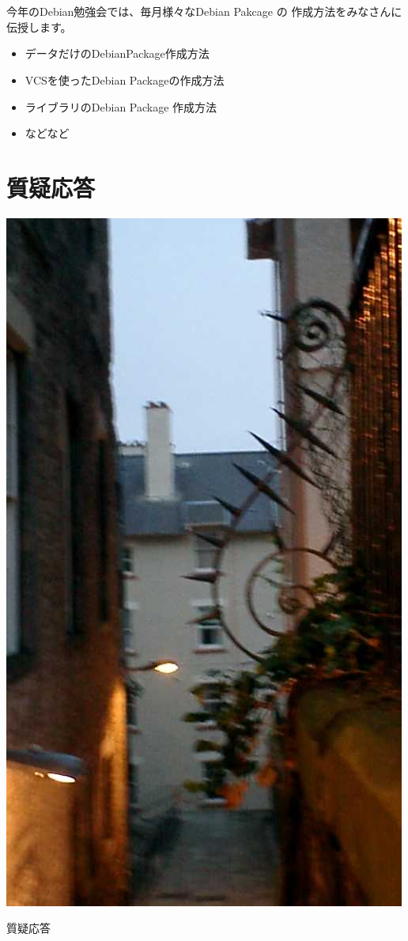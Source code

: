 \documentclass[cjk,dvipdfmx,12pt]{beamer}
\newcommand{\emtext}[1]{
\begin{frame}{}
 
\begin{minipage}{0.55\hsize}
\includegraphics[width=1\hsize]{image200707/gurutitle.jpg}
\end{minipage}
\begin{minipage}{0.39\hsize}
 {\Huge #1
 }
\end{minipage}
\end{frame}
}
\begin{document}
\section{}
\begin{frame}
今年のDebian勉強会では、毎月様々なDebian Pakcage の
作成方法をみなさんに伝授します。
\begin{itemize}
  \item データだけのDebianPackage作成方法
  \item VCSを使ったDebian Packageの作成方法
  \item ライブラリのDebian Package 作成方法
  \item などなど
\end{itemize}
\end{frame}


\section{質疑応答}
\emtext{質疑応答}
\end{document}
